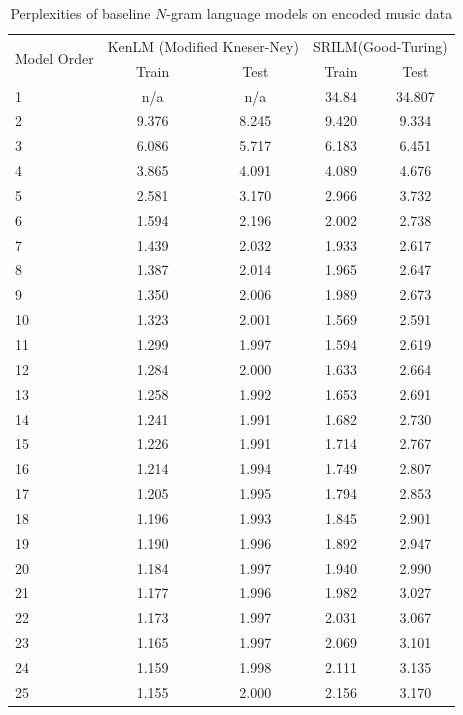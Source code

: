 \begin{table}[p]
  \centering
  \caption{Perplexities of baseline $N$-gram language models on encoded music data}
  \label{tab:baseline-perplexity}
\begin{tabular}{l c c c c}
  \toprule
  \multirow{2}{*}{Model Order} & \multicolumn{2}{c}{KenLM (Modified Kneser-Ney)} & \multicolumn{2}{c}{SRILM(Good-Turing)} \\
  \cmidrule{2-3}
  & Train & Test & Train & Test\\
  \midrule
1  & n/a   & n/a   & 34.84 & 34.807\\
2  & 9.376 & 8.245 & 9.420 & 9.334 \\
3  & 6.086 & 5.717 & 6.183 & 6.451 \\
4  & 3.865 & 4.091 & 4.089 & 4.676 \\
5  & 2.581 & 3.170 & 2.966 & 3.732 \\
6  & 1.594 & 2.196 & 2.002 & 2.738 \\
7  & 1.439 & 2.032 & 1.933 & 2.617 \\
8  & 1.387 & 2.014 & 1.965 & 2.647 \\
9  & 1.350 & 2.006 & 1.989 & 2.673 \\
10 & 1.323 & 2.001 & 1.569 & 2.591 \\
11 & 1.299 & 1.997 & 1.594 & 2.619 \\
12 & 1.284 & 2.000 & 1.633 & 2.664 \\
13 & 1.258 & 1.992 & 1.653 & 2.691 \\
14 & 1.241 & 1.991 & 1.682 & 2.730 \\
15 & 1.226 & 1.991 & 1.714 & 2.767 \\
16 & 1.214 & 1.994 & 1.749 & 2.807 \\
17 & 1.205 & 1.995 & 1.794 & 2.853 \\
18 & 1.196 & 1.993 & 1.845 & 2.901 \\
19 & 1.190 & 1.996 & 1.892 & 2.947 \\
20 & 1.184 & 1.997 & 1.940 & 2.990 \\
21 & 1.177 & 1.996 & 1.982 & 3.027 \\
22 & 1.173 & 1.997 & 2.031 & 3.067 \\
23 & 1.165 & 1.997 & 2.069 & 3.101 \\
24 & 1.159 & 1.998 & 2.111 & 3.135 \\
25 & 1.155 & 2.000 & 2.156 & 3.170 \\
  \bottomrule
\end{tabular}
\end{table}

